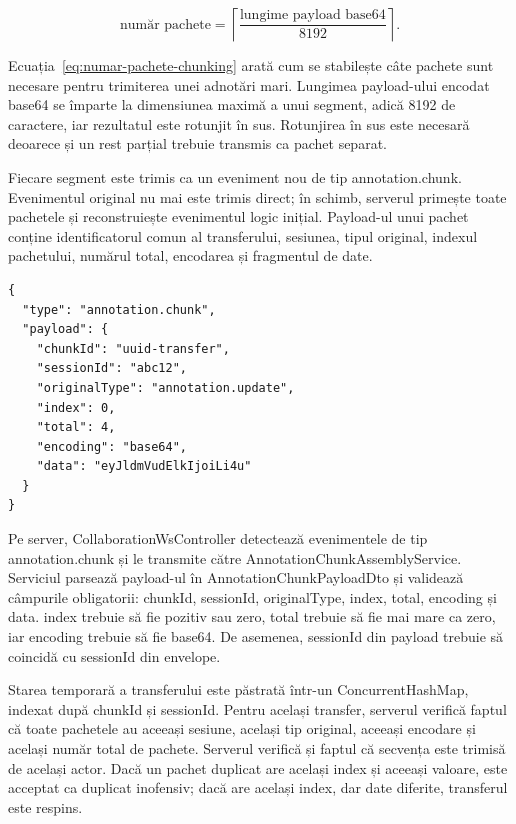 \begin{equation}
    \text{număr pachete} =
    \left\lceil
    \frac{\text{lungime payload base64}}{8192}
    \right\rceil.
    \label{eq:numar-pachete-chunking}
\end{equation}

Ecuația~\ref{eq:numar-pachete-chunking} arată cum se stabilește câte pachete sunt necesare pentru trimiterea unei adnotări mari. Lungimea payload-ului encodat base64 se împarte la dimensiunea maximă a unui segment, adică 8192 de caractere, iar rezultatul este rotunjit în sus. Rotunjirea în sus este necesară deoarece și un rest parțial trebuie transmis ca pachet separat.

Fiecare segment este trimis ca un eveniment nou de tip annotation.chunk. Evenimentul original nu mai este trimis direct; în schimb, serverul primește toate pachetele și reconstruiește evenimentul logic inițial. Payload-ul unui pachet conține identificatorul comun al transferului, sesiunea, tipul original, indexul pachetului, numărul total, encodarea și fragmentul de date.

\begin{verbatim}
{
  "type": "annotation.chunk",
  "payload": {
    "chunkId": "uuid-transfer",
    "sessionId": "abc12",
    "originalType": "annotation.update",
    "index": 0,
    "total": 4,
    "encoding": "base64",
    "data": "eyJldmVudElkIjoiLi4u"
  }
}
\end{verbatim}

Pe server, CollaborationWsController detectează evenimentele de tip annotation.chunk și le transmite către AnnotationChunkAssemblyService. Serviciul parsează payload-ul în AnnotationChunkPayloadDto și validează câmpurile obligatorii: chunkId, sessionId, originalType, index, total, encoding și data. index trebuie să fie pozitiv sau zero, total trebuie să fie mai mare ca zero, iar encoding trebuie să fie base64. De asemenea, sessionId din payload trebuie să coincidă cu sessionId din envelope.

Starea temporară a transferului este păstrată într-un ConcurrentHashMap, indexat după chunkId și sessionId. Pentru același transfer, serverul verifică faptul că toate pachetele au aceeași sesiune, același tip original, aceeași encodare și același număr total de pachete. Serverul verifică și faptul că secvența este trimisă de același actor. Dacă un pachet duplicat are același index și aceeași valoare, este acceptat ca duplicat inofensiv; dacă are același index, dar date diferite, transferul este respins.

